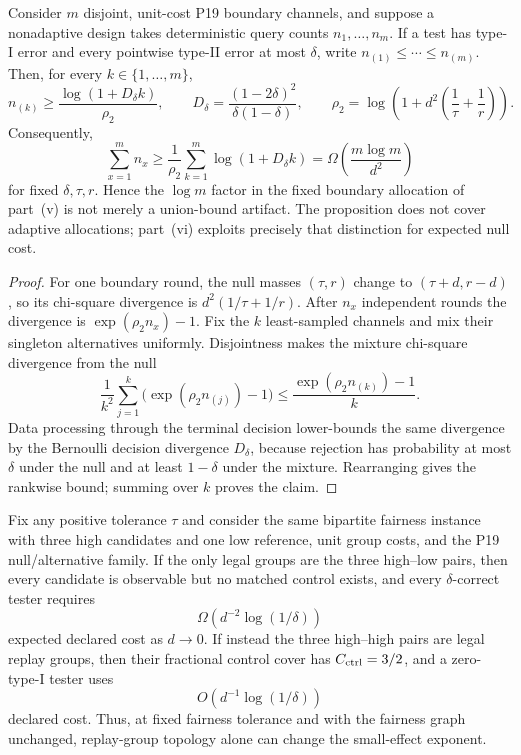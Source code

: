 \begin{proposition}
\label{prop:boundary-familywise-fixed}
Consider \(m\) disjoint, unit-cost P19 boundary channels, and suppose a
nonadaptive design takes deterministic query counts \(n_1,\ldots,n_m\).
If a test has type-I error and every pointwise type-II error at most
\(\delta\), write \(n_{(1)}\le\cdots\le n_{(m)}\).  Then, for every
\(k\in\{1,\ldots,m\}\),
\[
n_{(k)}
\ge
\frac{\log(1+D_\delta k)}{\rho_2},
\qquad
D_\delta=\frac{(1-2\delta)^2}{\delta(1-\delta)},
\qquad
\rho_2=\log\!\left(1+d^2\left(\frac1\tau+\frac1r\right)\right).
\]
Consequently,
\[
\sum_{x=1}^m n_x
\ge
\frac1{\rho_2}\sum_{k=1}^m\log(1+D_\delta k)
=\Omega\!\left(\frac{m\log m}{d^2}\right)
\]
for fixed \(\delta,\tau,r\).  Hence the \(\log m\) factor in the fixed
boundary allocation of part~(v) is not merely a union-bound artifact.  The
proposition does not cover adaptive allocations; part~(vi) exploits precisely
that distinction for expected null cost.
\end{proposition}

\begin{proof}
For one boundary round, the null masses \((\tau,r)\) change to
\((\tau+d,r-d)\), so its chi-square divergence is
\(d^2(1/\tau+1/r)\).  After \(n_x\) independent rounds the divergence is
\(\exp(\rho_2n_x)-1\).  Fix the \(k\) least-sampled channels and mix their
singleton alternatives uniformly.  Disjointness makes the mixture
chi-square divergence from the null
\[
\frac1{k^2}\sum_{j=1}^k
\bigl(\exp(\rho_2n_{(j)})-1\bigr)
\le
\frac{\exp(\rho_2n_{(k)})-1}{k}.
\]
Data processing through the terminal decision lower-bounds the same divergence
by the Bernoulli decision divergence
\(D_\delta\), because rejection has probability at most \(\delta\) under the
null and at least \(1-\delta\) under the mixture.  Rearranging gives the
rankwise bound; summing over \(k\) proves the claim.
\end{proof}

\begin{corollary}
\label{cor:control-topology-separation}
Fix any positive tolerance $\tau$ and consider the same bipartite fairness
instance with three high candidates and one low reference, unit group costs,
and the P19 null/alternative family.  If the only legal groups are the three
high--low pairs, then every candidate is observable but no matched control
exists, and every $\delta$-correct tester requires
\[
\Omega\!\left(d^{-2}\log(1/\delta)\right)
\]
expected declared cost as $d\to0$.  If instead the three high--high pairs are
legal replay groups, then their fractional control cover has
$C_{\rm ctrl}=3/2$, and a zero-type-I tester uses
\[
O\!\left(d^{-1}\log(1/\delta)\right)
\]
declared cost.  Thus, at fixed fairness tolerance and with the fairness graph
unchanged, replay-group topology alone can change the small-effect exponent.
\end{corollary}

